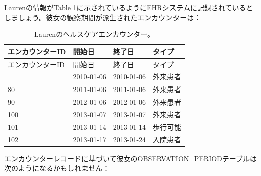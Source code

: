 \documentclass[
  11pt]{book}
\theoremstyle{definition}
\theoremstyle{definition}
\theoremstyle{definition}
\theoremstyle{definition}
\theoremstyle{remark}
\begin{document}
Laurenの情報がTable \ref{tab:encounters}に示されているようにEHRシステムに記録されているとしましょう。彼女の観察期間が派生されたエンカウンターは：

\begin{longtable}[]{@{}llll@{}}
\caption{\label{tab:encounters} Laurenのヘルスケアエンカウンター。}\tabularnewline
\toprule\noalign{}
エンカウンターID & 開始日 & 終了日 & タイプ \\
\midrule\noalign{}
\endfirsthead
\toprule\noalign{}
エンカウンターID & 開始日 & 終了日 & タイプ \\
\midrule\noalign{}
\endhead
\bottomrule\noalign{}
\endlastfoot
70 & 2010-01-06 & 2010-01-06 & 外来患者 \\
80 & 2011-01-06 & 2011-01-06 & 外来患者 \\
90 & 2012-01-06 & 2012-01-06 & 外来患者 \\
100 & 2013-01-07 & 2013-01-07 & 外来患者 \\
101 & 2013-01-14 & 2013-01-14 & 歩行可能 \\
102 & 2013-01-17 & 2013-01-24 & 入院患者 \\
\end{longtable}

エンカウンターレコードに基づいて彼女のOBSERVATION\_PERIODテーブルは次のようになるかもしれません：
\end{document}

